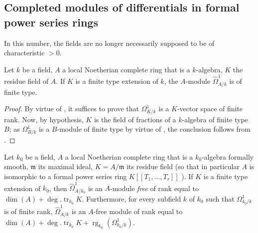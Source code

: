 \subsection{Completed modules of differentials in formal power series rings}
\label{subsection:0.21.9}

In this number, the fields are no longer necessarily supposed to be of characteristic $>0$.

\begin{lemma}[21.9.1]
\label{0.21.9.1}
Let $k$ be a field, $A$ a local Noetherian complete ring that is a $k$-algebra, $K$ the residue field of $A$.
If $K$ is a finite type extension of $k$, the $A$-module $\widehat{\Omega}^1_{A/k}$ is of finite type.
\end{lemma}

\begin{proof}
By virtue of , it suffices to prove that $\Omega^1_{K/k}$ is a $K$-vector space of finite rank.
Now, by hypothesis, $K$ is the field of fractions of a $k$-algebra of finite type $B$; as $\Omega^1_{B/k}$ is a $B$-module of finite type by virtue of , the conclusion follows from .
\end{proof}

\begin{proposition}[21.9.2]
\label{0.21.9.2}
Let $k_0$ be a field, $A$ a local Noetherian complete ring that is a $k_0$-algebra formally smooth, $\mathfrak{m}$ its maximal ideal, $K=A/\mathfrak{m}$ its residue field \textup{(}so that in particular $A$ is isomorphic to a formal power series ring $K[[T_1,\ldots,T_r]]$ \textup{)}.
If $K$ is a finite type extension of $k_0$, then $\widehat{\Omega}^1_{A/k_0}$ is an $A$-module \emph{free} of rank equal to $\dim(A)+\deg.\operatorname{tr}_{k_0} K$.
Furthermore, for every subfield $k$ of $k_0$ such that $\Omega^1_{k_0/k}$ is of finite rank, $\widehat{\Omega}^1_{A/k}$ is an $A$-free module of rank equal to $\dim(A)+\deg.\operatorname{tr}_{k_0} K+\operatorname{rg}_{k_0}(\Omega^1_{k_0/k})$.
\end{proposition}

